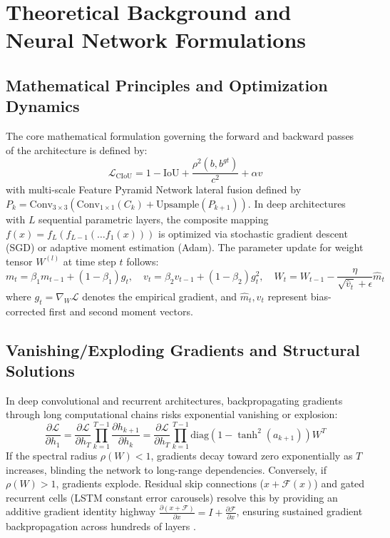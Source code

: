 \section{Theoretical Background and Neural Network Formulations}

\subsection{Mathematical Principles and Optimization Dynamics}
The core mathematical formulation governing the forward and backward passes of the architecture is defined by:
\begin{equation}
  \mathcal{L}_{\text{CIoU}} = 1 - \text{IoU} + \frac{\rho^2(b, b^{gt})}{c^2} + \alpha v
\label{eq:core_math}
\end{equation}
with multi-scale Feature Pyramid Network lateral fusion defined by $P_k = \text{Conv}_{3\times3}(\text{Conv}_{1\times1}(C_k) + \text{Upsample}(P_{k+1}))$.
In deep architectures with $L$ sequential parametric layers, the composite mapping $f(x) = f_L(f_{L-1}(\dots f_1(x)))$ is optimized via stochastic gradient descent (SGD) or adaptive moment estimation (Adam). The parameter update for weight tensor $W^{(l)}$ at time step $t$ follows:
\begin{equation}
  m_t = \beta_1 m_{t-1} + (1 - \beta_1) g_t, \quad v_t = \beta_2 v_{t-1} + (1 - \beta_2) g_t^2, \quad W_t = W_{t-1} - \frac{\eta}{\sqrt{\hat{v}_t} + \epsilon} \hat{m}_t
\end{equation}
where $g_t = \nabla_W \mathcal{L}$ denotes the empirical gradient, and $\hat{m}_t, \hat{v}_t$ represent bias-corrected first and second moment vectors.

\subsection{Vanishing/Exploding Gradients and Structural Solutions}
In deep convolutional and recurrent architectures, backpropagating gradients through long computational chains risks exponential vanishing or explosion:
\begin{equation}
  \frac{\partial \mathcal{L}}{\partial h_1} = \frac{\partial \mathcal{L}}{\partial h_T} \prod_{k=1}^{T-1} \frac{\partial h_{k+1}}{\partial h_k} = \frac{\partial \mathcal{L}}{\partial h_T} \prod_{k=1}^{T-1} \text{diag}(1 - \tanh^2(a_{k+1})) W^T
\end{equation}
If the spectral radius $\rho(W) < 1$, gradients decay toward zero exponentially as $T$ increases, blinding the network to long-range dependencies. Conversely, if $\rho(W) > 1$, gradients explode. Residual skip connections ($x + \mathcal{F}(x)$) and gated recurrent cells (LSTM constant error carousels) resolve this by providing an additive gradient identity highway $\frac{\partial (x + \mathcal{F})}{\partial x} = I + \frac{\partial \mathcal{F}}{\partial x}$, ensuring sustained gradient backpropagation across hundreds of layers \cite{he2016deep, hochreiter1997long}.

